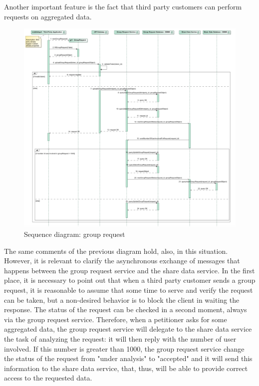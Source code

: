 \par 
Another important feature is the fact that third party customers can perform requests on aggregated data. \\


\begin{figure}[H]
\includegraphics[width=\linewidth]{Images/grouprequest.pdf}
\caption{ Sequence diagram: group request }
\label{fig:grouprequest}
\end{figure}

The same comments of the previous diagram hold, also, in this situation. 
However, it is relevant to clarify the asynchronous exchange of messages that happens between the group request service and the share data
service. 
In the first place, it is necessary to point out that when a third party customer sends a group request, it is reasonable to assume that 
some time to serve and verify the request can be taken, but a non-desired behavior is to block the client in waiting the response. The status
of the request can be checked in a second moment, always via the group request service. 
Therefore, when a petitioner asks for some aggregated data, the group request service will delegate to the share data service the task of 
analyzing the request: it will then reply with the number of user involved. If this number is greater than 1000, the group request service
change the status of the request from "under analysis" to "accepted" and it will send this information to the share data service, that, thus,
will be able to provide correct access to the requested data. \\

